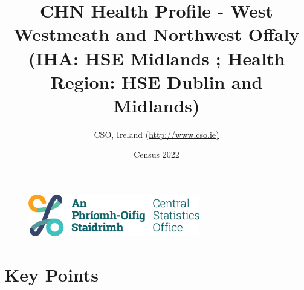 \documentclass{article}
\title{CHN Health Profile - West Westmeath and Northwest Offaly (IHA: HSE Midlands ;  Health Region: HSE Dublin and Midlands) }
\date{Census 2022}
\author{CSO, Ireland  (\url{http://www.cso.ie)}}
\begin{document}


\begin{figure}
	\centering
\includegraphics[width =75mm]{../figures/CSO_Logo.png}
\end{figure}

				 
		   
						  
														  
																																													
												 
			 
\maketitle
					
													   
				 
						 
																																																																											   
				 
				  
  \pagebreak
    	    \tableofcontents

\pagebreak


\section{Key Points}
\end{document}
